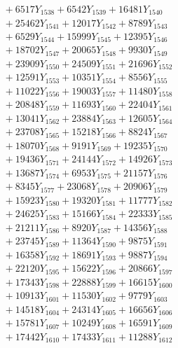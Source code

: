 \documentclass[a4paper,10pt]{article}
\begin{document}
{\begin{align}
&\;  + 6517 Y_{1538} + 6542 Y_{1539} + 16481 Y_{1540} \\[0.3ex]
&\;  + 25462 Y_{1541} + 12017 Y_{1542} + 8789 Y_{1543} \\[0.3ex]
&\;  + 6529 Y_{1544} + 15999 Y_{1545} + 12395 Y_{1546} \\[0.3ex]
&\;  + 18702 Y_{1547} + 20065 Y_{1548} + 9930 Y_{1549} \\[0.3ex]
&\;  + 23909 Y_{1550} + 24509 Y_{1551} + 21696 Y_{1552} \\[0.3ex]
&\;  + 12591 Y_{1553} + 10351 Y_{1554} + 8556 Y_{1555} \\[0.3ex]
&\;  + 11022 Y_{1556} + 19003 Y_{1557} + 11480 Y_{1558} \\[0.5ex]\allowbreak
&\;  + 20848 Y_{1559} + 11693 Y_{1560} + 22404 Y_{1561} \\[0.3ex]
&\;  + 13041 Y_{1562} + 23884 Y_{1563} + 12605 Y_{1564} \\[0.3ex]
&\;  + 23708 Y_{1565} + 15218 Y_{1566} + 8824 Y_{1567} \\[0.3ex]
&\;  + 18070 Y_{1568} + 9191 Y_{1569} + 19235 Y_{1570} \\[0.3ex]
&\;  + 19436 Y_{1571} + 24144 Y_{1572} + 14926 Y_{1573} \\[0.3ex]
&\;  + 13687 Y_{1574} + 6953 Y_{1575} + 21157 Y_{1576} \\[0.3ex]
&\;  + 8345 Y_{1577} + 23068 Y_{1578} + 20906 Y_{1579} \\[0.3ex]
&\;  + 15923 Y_{1580} + 19320 Y_{1581} + 11777 Y_{1582} \\[0.3ex]
&\;  + 24625 Y_{1583} + 15166 Y_{1584} + 22333 Y_{1585} \\[0.3ex]
&\;  + 21211 Y_{1586} + 8920 Y_{1587} + 14356 Y_{1588} \\[0.5ex]\allowbreak
&\;  + 23745 Y_{1589} + 11364 Y_{1590} + 9875 Y_{1591} \\[0.3ex]
&\;  + 16358 Y_{1592} + 18691 Y_{1593} + 9887 Y_{1594} \\[0.3ex]
&\;  + 22120 Y_{1595} + 15622 Y_{1596} + 20866 Y_{1597} \\[0.3ex]
&\;  + 17343 Y_{1598} + 22888 Y_{1599} + 16615 Y_{1600} \\[0.3ex]
&\;  + 10913 Y_{1601} + 11530 Y_{1602} + 9779 Y_{1603} \\[0.3ex]
&\;  + 14518 Y_{1604} + 24314 Y_{1605} + 16656 Y_{1606} \\[0.3ex]
&\;  + 15781 Y_{1607} + 10249 Y_{1608} + 16591 Y_{1609} \\[0.3ex]
&\;  + 17442 Y_{1610} + 17433 Y_{1611} + 11288 Y_{1612} \\[0.3ex]

\end{align}}
\end{document}
